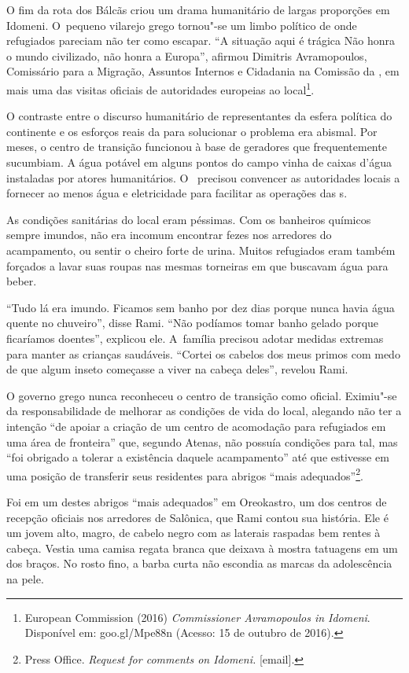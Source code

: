 O fim da rota dos Bálcãs criou um drama humanitário de largas proporções
em Idomeni. O~pequeno vilarejo grego tornou"-se um limbo político de onde
refugiados pareciam não ter como escapar. ``A situação aqui é trágica
\redondo{[…]} Não honra o mundo civilizado, não honra a Europa'',
afirmou Dimitris Avramopoulos, Comissário para a Migração, Assuntos
Internos e Cidadania na Comissão da , em mais uma das visitas oficiais
de autoridades europeias ao local\footnote{ European Commission (2016) \emph{Commissioner
Avramopoulos in Idomeni}. Disponível em:
goo.gl/Mpe88n (Acesso: 15
de outubro de 2016).}.

O contraste entre o discurso humanitário de representantes da esfera
política do continente e os esforços reais da  para solucionar o
problema era abismal. Por meses, o centro de transição funcionou à base
de geradores que frequentemente sucumbiam. A água potável em alguns
pontos do campo vinha de caixas d'água instaladas por atores
humanitários. O~ precisou convencer as autoridades locais a fornecer
ao menos água e eletricidade para facilitar as operações das s.

As condições sanitárias do local eram péssimas. Com os banheiros
químicos sempre imundos, não era incomum encontrar fezes nos arredores
do acampamento, ou sentir o cheiro forte de urina. Muitos refugiados
eram também forçados a lavar suas roupas nas mesmas torneiras em que
buscavam água para beber.

``Tudo lá era imundo. Ficamos sem banho por dez dias porque nunca havia
água quente no chuveiro'', disse Rami. ``Não podíamos tomar banho gelado
porque ficaríamos doentes'', explicou ele. A~família precisou adotar
medidas extremas para manter as crianças saudáveis. ``Cortei os cabelos
dos meus primos com medo de que algum inseto começasse a viver na cabeça
deles'', revelou Rami.

O governo grego nunca reconheceu o centro de transição como oficial.
Eximiu"-se da responsabilidade de melhorar as condições de vida do local,
alegando não ter a intenção ``de apoiar a criação de um centro de
acomodação para refugiados em uma área de fronteira'' que, segundo
Atenas, não possuía condições para tal, mas ``foi obrigado a tolerar a
existência daquele acampamento'' até que estivesse em uma posição de
transferir seus residentes para abrigos ``mais
adequados''\footnote{ Press Office. \emph{Request for comments on
Idomeni}\emph{.} {[}email{]}.}.

Foi em um destes abrigos ``mais adequados'' em Oreokastro, um dos
centros de recepção oficiais nos arredores de Salônica, que Rami contou
sua história. Ele é um jovem alto, magro, de cabelo negro com as
laterais raspadas bem rentes à cabeça. Vestia uma camisa regata branca
que deixava à mostra tatuagens em um dos braços. No rosto fino, a barba
curta não escondia as marcas da adolescência na pele.

